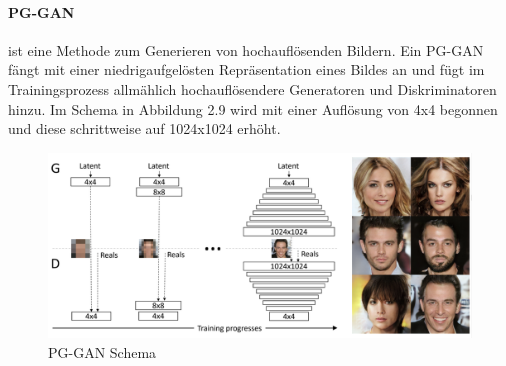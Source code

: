 \paragraph[]{PG-GAN}
 ist eine Methode zum Generieren von hochauflösenden Bildern. Ein PG-GAN fängt mit einer niedrigaufgelösten Repräsentation eines Bildes an und fügt im Trainingsprozess allmählich hochauflösendere Generatoren und Diskriminatoren hinzu. Im Schema in Abbildung 2.9 wird mit einer Auflösung von 4x4 begonnen und diese schrittweise auf 1024x1024 erhöht.
\begin{figure}[H]
    \centering
    \includegraphics[width=1\textwidth,angle=0]{abb/pggan_schema}
    \caption[PG-GAN Schema]{PG-GAN Schema \cite{kar19}}
\end{figure}

